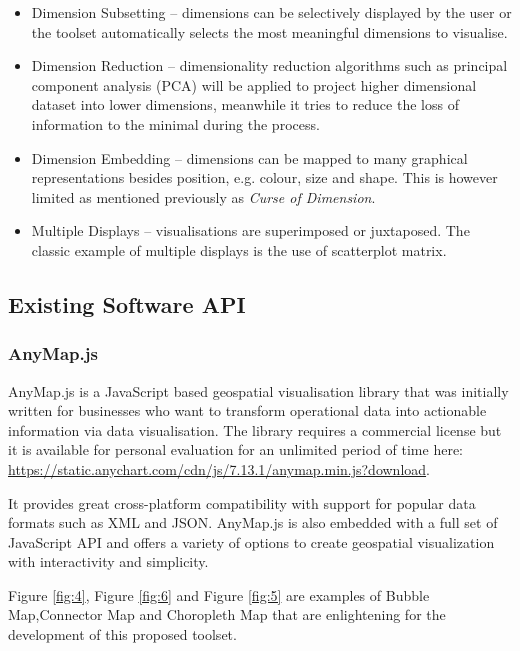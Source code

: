 \documentclass[doc,natbib]{apa6}
\begin{document}
\begin{itemize}
	\item Dimension Subsetting -- dimensions can be selectively displayed by the user or the toolset automatically selects the most meaningful dimensions to visualise.
	\item Dimension Reduction -- dimensionality reduction algorithms such as principal component analysis (PCA) will be applied to project higher dimensional dataset into lower dimensions, meanwhile it tries to reduce the loss of information to the minimal during the process.
	\item Dimension Embedding -- dimensions can be mapped to many graphical representations besides position, e.g. colour, size and shape. This is however limited as mentioned previously as \textit{Curse of Dimension}.
	\item Multiple Displays -- visualisations are superimposed or juxtaposed. The classic example of multiple displays is the use of scatterplot matrix.
\end{itemize}

\subsection{Existing Software API}
\subsubsection{AnyMap.js}\hfil\newline
AnyMap.js is a JavaScript based geospatial visualisation library that was initially written for businesses who want to transform operational data into actionable information via data visualisation. The library requires a commercial license but it is available for personal evaluation for an unlimited period of time here: \url{https://static.anychart.com/cdn/js/7.13.1/anymap.min.js?download}. 

It provides great cross-platform compatibility with support for popular data formats such as XML and JSON. AnyMap.js is also embedded with a full set of JavaScript API and offers a variety of options to create geospatial visualization with interactivity and simplicity.

Figure \ref{fig:4}, Figure \ref{fig:6} and Figure \ref{fig:5} are examples of Bubble Map,Connector Map and Choropleth Map that are enlightening for the development of this proposed toolset.
\end{document}

